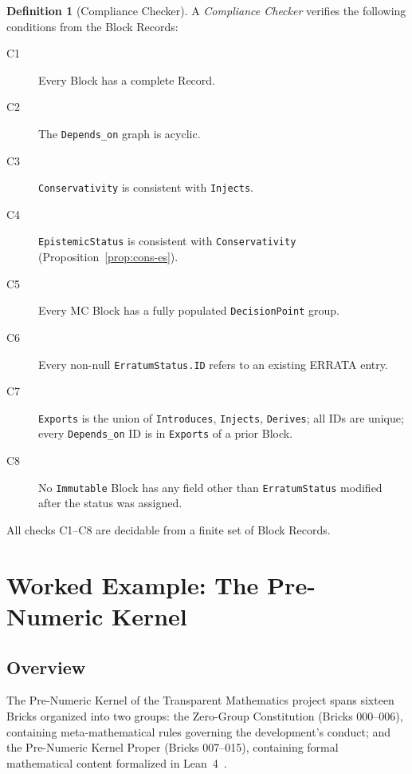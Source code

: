 \documentclass[12pt, a4paper]{article}
\theoremstyle{plain}
\theoremstyle{definition}
\newtheorem{definition}[theorem]{Definition}
\theoremstyle{remark}
\newcommand{\MC}{\mathrm{MC}}
\begin{document}
\begin{definition}[Compliance Checker]
\label{def:checker}
A \emph{Compliance Checker} verifies the following conditions from
the Block Records:
\begin{description}
  \item[C1] Every Block has a complete Record.
  \item[C2] The \texttt{Depends\_on} graph is acyclic.
  \item[C3] \texttt{Conservativity} is consistent with
            \texttt{Injects}.
  \item[C4] \texttt{EpistemicStatus} is consistent with
            \texttt{Conservativity} (Proposition~\ref{prop:cons-es}).
  \item[C5] Every $\MC$ Block has a fully populated
            \texttt{DecisionPoint} group.
  \item[C6] Every non-null \texttt{ErratumStatus.ID} refers to an
            existing ERRATA entry.
  \item[C7] \texttt{Exports} is the union of \texttt{Introduces},
            \texttt{Injects}, \texttt{Derives}; all IDs are unique;
            every \texttt{Depends\_on} ID is in \texttt{Exports} of
            a prior Block.
  \item[C8] No \texttt{Immutable} Block has any field other than
            \texttt{ErratumStatus} modified after the status was
            assigned.
\end{description}
All checks C1--C8 are decidable from a finite set of Block Records.
\end{definition}

\section{Worked Example: The Pre-Numeric Kernel}
\label{sec:example}

\subsection{Overview}
\label{subsec:ex-overview}

The Pre-Numeric Kernel of the Transparent Mathematics project spans
sixteen Bricks organized into two groups: the Zero-Group Constitution
(Bricks 000--006), containing meta-mathematical rules governing the
development's conduct; and the Pre-Numeric Kernel Proper (Bricks
007--015), containing formal mathematical content formalized in
Lean~4~\cite{Lean4,deMouraEtAl2015}.
\end{document}

